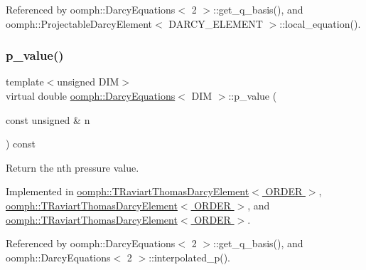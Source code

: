 Referenced by oomph\+::\+Darcy\+Equations$<$ 2 $>$\+::get\+\_\+q\+\_\+basis(), and oomph\+::\+Projectable\+Darcy\+Element$<$ D\+A\+R\+C\+Y\+\_\+\+E\+L\+E\+M\+E\+N\+T $>$\+::local\+\_\+equation().

\mbox{\label{classoomph_1_1DarcyEquations_a788824ffa37b4fcae4d45eee75f2c39e}} 
\subsubsection{\texorpdfstring{p\+\_\+value()}{p\_value()}}
{\footnotesize\ttfamily template$<$unsigned D\+IM$>$ \\
virtual double \hyperlink{classoomph_1_1DarcyEquations}{oomph\+::\+Darcy\+Equations}$<$ D\+IM $>$\+::p\+\_\+value (\begin{DoxyParamCaption}\item[{const unsigned \&}]{n }\end{DoxyParamCaption}) const\hspace{0.3cm}{\ttfamily [pure virtual]}}



Return the nth pressure value. 



Implemented in \hyperlink{classoomph_1_1TRaviartThomasDarcyElement_ab99e0a8bb2f6ba44dc4e54e0c2fda887}{oomph\+::\+T\+Raviart\+Thomas\+Darcy\+Element$<$ O\+R\+D\+E\+R $>$}, \hyperlink{classoomph_1_1TRaviartThomasDarcyElement_a4d1ad5a3473c1d8e4b477bedf5cb88d5}{oomph\+::\+T\+Raviart\+Thomas\+Darcy\+Element$<$ O\+R\+D\+E\+R $>$}, and \hyperlink{classoomph_1_1TRaviartThomasDarcyElement_aa21b6aad78ec35c661c69fb67700b7e1}{oomph\+::\+T\+Raviart\+Thomas\+Darcy\+Element$<$ O\+R\+D\+E\+R $>$}.



Referenced by oomph\+::\+Darcy\+Equations$<$ 2 $>$\+::get\+\_\+q\+\_\+basis(), and oomph\+::\+Darcy\+Equations$<$ 2 $>$\+::interpolated\+\_\+p().

\mbox{\label{classoomph_1_1DarcyEquations_a93c88bdb79b37be378f5ef4dbe197fa6}} 

